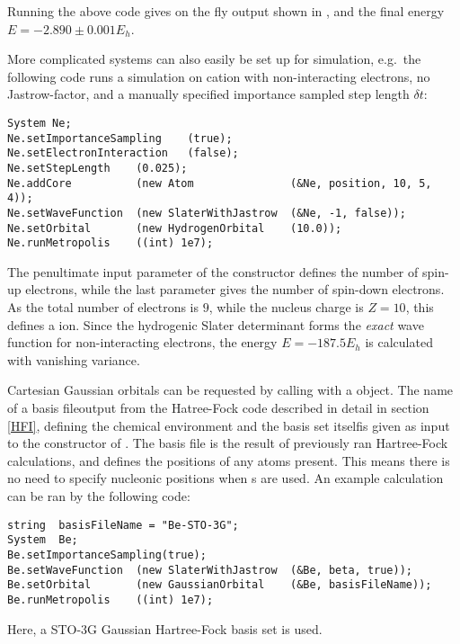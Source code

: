 \documentclass[../../master.tex]{subfiles}
\begin{document}
Running the above code gives on the fly output shown in , and the final energy $E=-2.890\pm0.001E_h$.

More complicated systems can also easily be set up for simulation, e.g.\ the following code runs a simulation on  cation with non-interacting electrons, no Jastrow-factor, and a manually specified importance sampled step length $\delta t$:
\begin{lstlisting}[language={[std]c++}]
System Ne;
Ne.setImportanceSampling    (true);
Ne.setElectronInteraction   (false);
Ne.setStepLength    (0.025);
Ne.addCore          (new Atom               (&Ne, position, 10, 5, 4));
Ne.setWaveFunction  (new SlaterWithJastrow  (&Ne, -1, false));
Ne.setOrbital       (new HydrogenOrbital    (10.0));
Ne.runMetropolis    ((int) 1e7);
\end{lstlisting}
The penultimate input parameter of the  constructor defines the number of spin-up electrons, while the last parameter gives the number of spin-down electrons. As the total number of electrons is $9$, while the nucleus charge is $Z=10$, this defines a  ion. Since the hydrogenic Slater determinant forms the \emph{exact} wave function for non-interacting electrons, the energy $E=-187.5E_h$ is calculated with vanishing variance. 

Cartesian Gaussian orbitals can be requested by calling  with a  object. The name of a basis file\textemdash output from the Hatree-Fock code described in detail in section \ref{HFI}, defining the chemical environment and the basis set itself\textemdash is given as input to the constructor of . The basis file is the result of previously ran Hartree-Fock calculations, and defines the positions of any atoms present. This means there is no need to specify nucleonic positions when s are used. An example calculation can be ran by the following  code:
\begin{lstlisting}[language={[std]c++}]
string  basisFileName = "Be-STO-3G";
System  Be;
Be.setImportanceSampling(true);
Be.setWaveFunction  (new SlaterWithJastrow  (&Be, beta, true));
Be.setOrbital       (new GaussianOrbital    (&Be, basisFileName));
Be.runMetropolis    ((int) 1e7);
\end{lstlisting}
Here, a STO-3G Gaussian Hartree-Fock basis set is used. 

\renewcommand{\r}{{\bf r}}
\newcommand{\x}{{\bf x}}
\renewcommand{\R}{{\bf R}}
\newcommand{\Psit}{\Psi_\text{T}}
\newcommand{\pphi}{\tilde{\phi}}
\end{document}
